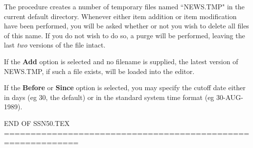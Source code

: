 The procedure creates  a number of temporary files named ``NEWS.TMP" in the
current default directory. 
Whenever either item addition or item modification have been performed, you will
be asked whether or not you wish to delete all files of this name.
If you do not wish to do so, a purge will be performed, leaving the last
{\em two} versions of the file intact. 

If the {\bf Add} option is selected and no filename is supplied, the latest
version of NEWS.TMP, if such a file exists, will be loaded into the editor. 

If the {\bf Before} or {\bf Since} option is selected, you may specify the
cutoff date either in days (eg 30, the default) or in the standard system 
time format (eg 30-AUG-1989).


END OF SSN50.TEX ============================================================
